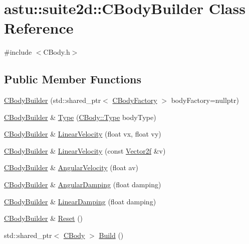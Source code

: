 \hypertarget{classastu_1_1suite2d_1_1CBodyBuilder}{}\section{astu\+:\+:suite2d\+:\+:C\+Body\+Builder Class Reference}
\label{classastu_1_1suite2d_1_1CBodyBuilder}


{\ttfamily \#include $<$C\+Body.\+h$>$}

\subsection*{Public Member Functions}
\begin{DoxyCompactItemize}
\item 
\hyperlink{classastu_1_1suite2d_1_1CBodyBuilder_a0ca8f798e66caf8f32fec25698c2a4ef}{C\+Body\+Builder} (std\+::shared\+\_\+ptr$<$ \hyperlink{classastu_1_1suite2d_1_1CBodyFactory}{C\+Body\+Factory} $>$ body\+Factory=nullptr)
\item 
\hyperlink{classastu_1_1suite2d_1_1CBodyBuilder}{C\+Body\+Builder} \& \hyperlink{classastu_1_1suite2d_1_1CBodyBuilder_a42f2d0af41647c1617cb948d72d2fe0f}{Type} (\hyperlink{classastu_1_1suite2d_1_1CBody_a5731a8b9f24de5494683e4b7e8016b64}{C\+Body\+::\+Type} body\+Type)
\item 
\hyperlink{classastu_1_1suite2d_1_1CBodyBuilder}{C\+Body\+Builder} \& \hyperlink{classastu_1_1suite2d_1_1CBodyBuilder_a15294ce7b267061e70013553cc3c171d}{Linear\+Velocity} (float vx, float vy)
\item 
\hyperlink{classastu_1_1suite2d_1_1CBodyBuilder}{C\+Body\+Builder} \& \hyperlink{classastu_1_1suite2d_1_1CBodyBuilder_a3b30b6a22dbbace93d0867cb04131b5c}{Linear\+Velocity} (const \hyperlink{classastu_1_1Vector2}{Vector2f} \&v)
\item 
\hyperlink{classastu_1_1suite2d_1_1CBodyBuilder}{C\+Body\+Builder} \& \hyperlink{classastu_1_1suite2d_1_1CBodyBuilder_a7a8919a8033bc348a4aba8b215db8351}{Angular\+Velocity} (float av)
\item 
\hyperlink{classastu_1_1suite2d_1_1CBodyBuilder}{C\+Body\+Builder} \& \hyperlink{classastu_1_1suite2d_1_1CBodyBuilder_a8228f975cbec219125323d06fc6d0f16}{Angular\+Damping} (float damping)
\item 
\hyperlink{classastu_1_1suite2d_1_1CBodyBuilder}{C\+Body\+Builder} \& \hyperlink{classastu_1_1suite2d_1_1CBodyBuilder_af8bac26e1270985e9da41aa7f6eff9a7}{Linear\+Damping} (float damping)
\item 
\hyperlink{classastu_1_1suite2d_1_1CBodyBuilder}{C\+Body\+Builder} \& \hyperlink{classastu_1_1suite2d_1_1CBodyBuilder_aa1eba70e75a9b7ac0c915e9b2f2cdf8d}{Reset} ()
\item 
std\+::shared\+\_\+ptr$<$ \hyperlink{classastu_1_1suite2d_1_1CBody}{C\+Body} $>$ \hyperlink{classastu_1_1suite2d_1_1CBodyBuilder_a2a08001660aaa09c683a6b66d7f1a47d}{Build} ()
\end{DoxyCompactItemize}



